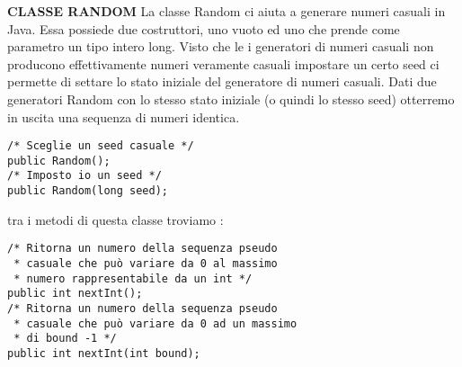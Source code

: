 \noindent \textbf{CLASSE RANDOM } \newline
La classe Random ci aiuta a generare numeri casuali in Java. Essa possiede due costruttori, uno vuoto ed uno che prende come parametro un tipo intero long. Visto che le i generatori di numeri casuali non producono effettivamente numeri veramente casuali impostare un certo seed ci permette di settare lo stato iniziale del generatore di numeri casuali. Dati due generatori Random con lo stesso stato iniziale (o quindi lo stesso seed) otterremo in uscita una sequenza di numeri identica.
\begin{lstlisting}
/* Sceglie un seed casuale */
public Random();
/* Imposto io un seed */
public Random(long seed);
\end{lstlisting}
\noindent tra i metodi di questa classe troviamo :
\begin{lstlisting}
/* Ritorna un numero della sequenza pseudo
 * casuale che può variare da 0 al massimo
 * numero rappresentabile da un int */
public int nextInt();
/* Ritorna un numero della sequenza pseudo
 * casuale che può variare da 0 ad un massimo
 * di bound -1 */
public int nextInt(int bound);
\end{lstlisting}


